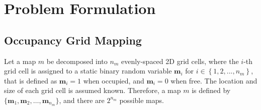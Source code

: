 \documentclass[letterpaper, 10pt]{ieeeconf}
\newcommand{\braces}[1]{\ensuremath{\left\{ #1 \right\}}}
\begin{document}



\section{Problem Formulation}

\subsection{Occupancy Grid Mapping}

Let a map $m$ be decomposed into $n_m$ evenly-spaced 2D grid cells, where the $i$-th grid cell is assigned to a static binary random variable $\mathbf{m}_i$ for $i\in\braces{1,2,...,n_m}$, that is defined as $\mathbf{m}_i=1$ when occupied, and $\mathbf{m}_i=0$ when free. The location and size of each grid cell is assumed known. Therefore, a map $m$ is defined by $\{\mathbf{m}_1,\mathbf{m}_2,\ldots, \mathbf{m}_{n_m}\}$, and there are $2^{n_{m}}$ possible maps. 
\end{document}
